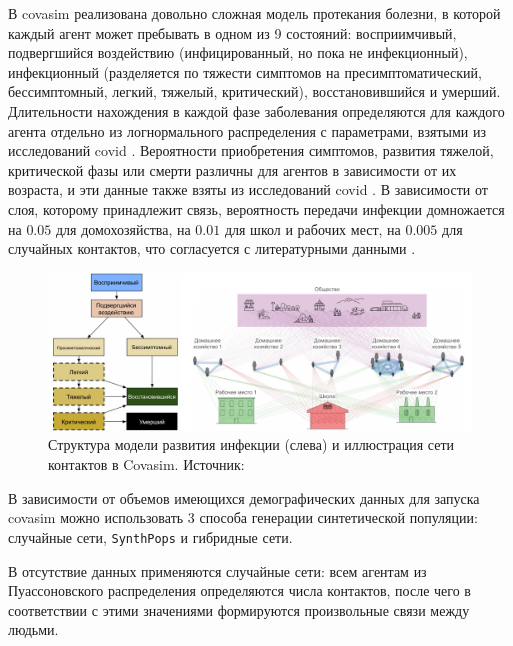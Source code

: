\documentclass[a4paper,12pt]{article} %
\begin{document}
В \gls{covasim} реализована довольно сложная модель протекания болезни, в которой каждый агент может пребывать в одном из 9 состояний: восприимчивый, подвергшийся воздействию (инфицированный, но пока не инфекционный), инфекционный (разделяется по тяжести симптомов на пресимптоматический, бессимптомный, легкий, тяжелый, критический), восстановившийся и умерший. Длительности нахождения в каждой фазе заболевания определяются для каждого агента отдельно из логнормального распределения с параметрами, взятыми из исследований \gls{covid} \cite{lauer2020incubation, du2020serial, nishiura2020serial, pung2020investigation, linton2020incubation, he2020temporal, wang2020clinical, chen2020clinical, verity2020estimates, wolfel2020virological}. Вероятности приобретения симптомов, развития тяжелой, критической фазы или смерти различны для агентов в зависимости от их возраста, и эти данные также взяты из исследований \gls{covid} \cite{chen2020clinical, wolfel2020virological, o2021age, baguelin2020report, ferguson2020impact}. В зависимости от слоя, которому принадлежит связь, вероятность передачи инфекции домножается на $0.05$ для домохозяйства, на $0.01$ для школ и рабочих мест, на $0.005$ для случайных контактов, что согласуется с литературными данными \cite{zhang2020changes, lader2006time}.

\begin{figure}[]
    \centering
    \includegraphics[width=\linewidth]{images/covasim.pdf}
    \caption{Структура модели развития инфекции (слева) и иллюстрация сети контактов в Covasim. Источник: \cite{kerr2021covasim}}
\end{figure}

В зависимости от объемов имеющихся демографических данных для запуска \gls{covasim} можно использовать 3 способа генерации синтетической популяции: случайные сети, \texttt{SynthPops} и гибридные сети.

В отсутствие данных применяются случайные сети: всем агентам из Пуассоновского распределения определяются числа контактов, после чего в соответствии с этими значениями формируются произвольные связи между людьми.
\end{document}
